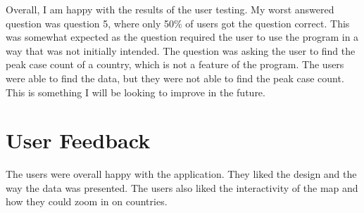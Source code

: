\documentclass{report}
\begin{document}
\newpage
Overall, I am happy with the results of the user testing. My worst answered question was question 5, where only 50\% of users got the question correct. This was somewhat expected as the question required the user to use the program in a way that was not initially intended. The question was asking the user to find the peak case count of a country, which is not a feature of the program. The users were able to find the data, but they were not able to find the peak case count. This is something I will be looking to improve in the future.

\section{User Feedback}
The users were overall happy with the application. They liked the design and the way the data was presented. The users also liked the interactivity of the map and how they could zoom in on countries.\\
\end{document}
